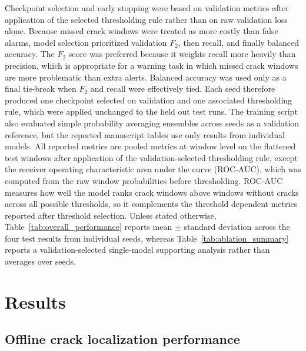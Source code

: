 \documentclass[fleqn,10pt]{wlscirep}
\begin{document}
Checkpoint selection and early stopping were based on validation metrics after application of the selected thresholding rule rather than on raw validation loss alone. Because missed crack windows were treated as more costly than false alarms, model selection prioritized validation $F_2$, then recall, and finally balanced accuracy. The $F_2$ score was preferred because it weights recall more heavily than precision, which is appropriate for a warning task in which missed crack windows are more problematic than extra alerts. Balanced accuracy was used only as a final tie-break when $F_2$ and recall were effectively tied. Each seed therefore produced one checkpoint selected on validation and one associated thresholding rule, which were applied unchanged to the held out test runs. The training script also evaluated simple probability averaging ensembles across seeds as a validation reference, but the reported manuscript tables use only results from individual models. All reported metrics are pooled metrics at window level on the flattened test windows after application of the validation-selected thresholding rule, except the receiver operating characteristic area under the curve (ROC-AUC), which was computed from the raw window probabilities before thresholding. ROC-AUC measures how well the model ranks crack windows above windows without cracks across all possible thresholds, so it complements the threshold dependent metrics reported after threshold selection. Unless stated otherwise, Table~\ref{tab:overall_performance} reports mean $\pm$ standard deviation across the four test results from individual seeds, whereas Table~\ref{tab:ablation_summary} reports a validation-selected single-model supporting analysis rather than averages over seeds.

\section*{Results}

\subsection*{Offline crack localization performance}
\end{document}

